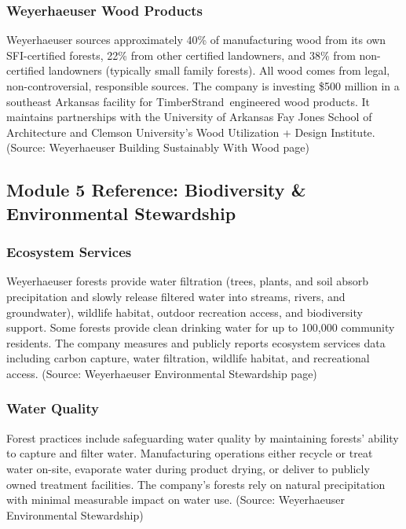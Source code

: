 \documentclass[11pt,letterpaper]{article}
\begin{document}
\subsubsection{Weyerhaeuser Wood Products}

Weyerhaeuser sources approximately 40\% of manufacturing wood from its own SFI-certified forests, 22\% from other certified landowners, and 38\% from non-certified landowners (typically small family forests). All wood comes from legal, non-controversial, responsible sources. The company is investing \$500 million in a southeast Arkansas facility for TimberStrand\textregistered\ engineered wood products. It maintains partnerships with the University of Arkansas Fay Jones School of Architecture and Clemson University's Wood Utilization + Design Institute. (Source: Weyerhaeuser Building Sustainably With Wood page)

\subsection{Module 5 Reference: Biodiversity \& Environmental Stewardship}

\subsubsection{Ecosystem Services}

Weyerhaeuser forests provide water filtration (trees, plants, and soil absorb precipitation and slowly release filtered water into streams, rivers, and groundwater), wildlife habitat, outdoor recreation access, and biodiversity support. Some forests provide clean drinking water for up to 100,000 community residents. The company measures and publicly reports ecosystem services data including carbon capture, water filtration, wildlife habitat, and recreational access. (Source: Weyerhaeuser Environmental Stewardship page)

\subsubsection{Water Quality}

Forest practices include safeguarding water quality by maintaining forests' ability to capture and filter water. Manufacturing operations either recycle or treat water on-site, evaporate water during product drying, or deliver to publicly owned treatment facilities. The company's forests rely on natural precipitation with minimal measurable impact on water use. (Source: Weyerhaeuser Environmental Stewardship)
\end{document}
